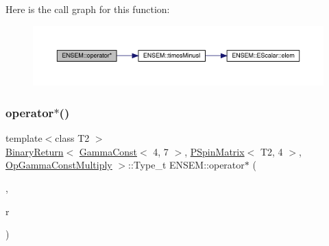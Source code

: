 Here is the call graph for this function\+:\nopagebreak
\begin{figure}[H]
\begin{center}
\leavevmode
\includegraphics[width=350pt]{d6/df5/group__primspinmatrix_ga6159ef586816bd93e368fd7d18f601ad_cgraph}
\end{center}
\end{figure}
\mbox{\label{group__primspinmatrix_ga05f36a58daa404d7245006a9dd7323bb}} 
\subsubsection{\texorpdfstring{operator$\ast$()}{operator*()}\hspace{0.1cm}{\footnotesize\ttfamily [8/64]}}
{\footnotesize\ttfamily template$<$class T2 $>$ \\
\mbox{\hyperlink{structENSEM_1_1BinaryReturn}{Binary\+Return}}$<$ \mbox{\hyperlink{classENSEM_1_1GammaConst}{Gamma\+Const}}$<$ 4, 7 $>$, \mbox{\hyperlink{classENSEM_1_1PSpinMatrix}{P\+Spin\+Matrix}}$<$ T2, 4 $>$, \mbox{\hyperlink{structENSEM_1_1OpGammaConstMultiply}{Op\+Gamma\+Const\+Multiply}} $>$\+::Type\+\_\+t E\+N\+S\+E\+M\+::operator$\ast$ (\begin{DoxyParamCaption}\item[{const \mbox{\hyperlink{classENSEM_1_1GammaConst}{Gamma\+Const}}$<$ 4, 7 $>$ \&}]{,  }\item[{const \mbox{\hyperlink{classENSEM_1_1PSpinMatrix}{P\+Spin\+Matrix}}$<$ T2, 4 $>$ \&}]{r }\end{DoxyParamCaption})\hspace{0.3cm}{\ttfamily [inline]}}

\mbox{\label{group__primspinmatrix_ga14cbf328548b8d7ab484cf88d9190adf}} 
